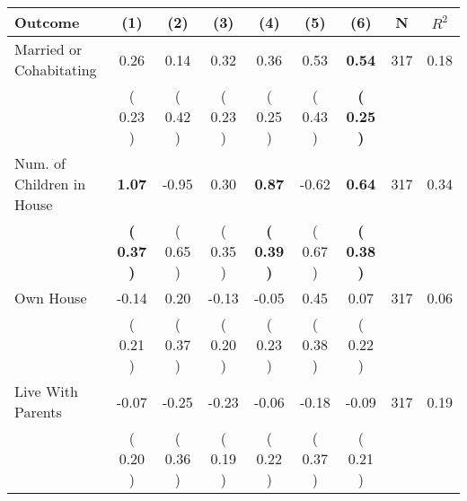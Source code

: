 \begin{tabular}{lcccccccc}
\toprule
 \textbf{Outcome} & \textbf{(1)} & \textbf{(2)} & \textbf{(3)} & \textbf{(4)} & \textbf{(5)} & \textbf{(6)} & \textbf{N} & \textbf{$ R^2$} \\
\midrule
Married or Cohabitating &      0.26 &      0.14 &      0.32 &      0.36 &      0.53 & \textbf{     0.54} & 317 &       0.18 \\ 
 & (     0.23 ) & (     0.42 ) & (     0.23 ) & (     0.25 ) & (     0.43 ) & \textbf{(     0.25 )} & \\
Num. of Children in House & \textbf{     1.07} &     -0.95 &      0.30 & \textbf{     0.87} &     -0.62 & \textbf{     0.64} & 317 &       0.34 \\ 
 & \textbf{(     0.37 )} & (     0.65 ) & (     0.35 ) & \textbf{(     0.39 )} & (     0.67 ) & \textbf{(     0.38 )} & \\
Own House &     -0.14 &      0.20 &     -0.13 &     -0.05 &      0.45 &      0.07 & 317 &       0.06 \\ 
 & (     0.21 ) & (     0.37 ) & (     0.20 ) & (     0.23 ) & (     0.38 ) & (     0.22 ) & \\
Live With Parents &     -0.07 &     -0.25 &     -0.23 &     -0.06 &     -0.18 &     -0.09 & 317 &       0.19 \\ 
 & (     0.20 ) & (     0.36 ) & (     0.19 ) & (     0.22 ) & (     0.37 ) & (     0.21 ) & \\
\bottomrule
\end{tabular}
